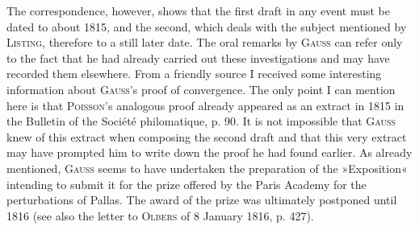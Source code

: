 \par\noindent\hspace*{\parindent}The correspondence, however, shows that the first
draft in any event must be dated to about 1815, and the second, which deals with the subject mentioned by \textsc{Listing},
therefore to a still later date. The oral remarks by \textsc{Gauss} can refer
only to the fact that he had already carried out these investigations
and may have recorded them elsewhere. From a friendly source I received
some interesting information about \textsc{Gauss}'s proof of convergence.
The only point I can mention here is that \textsc{Poisson}'s analogous proof already
appeared as an extract in 1815 in the Bulletin of the Société philomatique, p. 90.
It is not impossible that \textsc{Gauss} knew of this extract when composing the second
draft and that this very extract may have prompted him to write down
the proof he had found earlier. As already mentioned, \textsc{Gauss} seems
to have undertaken the preparation of the »Exposition« intending to submit it for the
prize offered by the Paris Academy for the perturbations of Pallas.
The award of the prize was ultimately postponed until 1816
(see also the letter to \textsc{Olbers} of 8 January 1816, p. 427).
\endgroup
